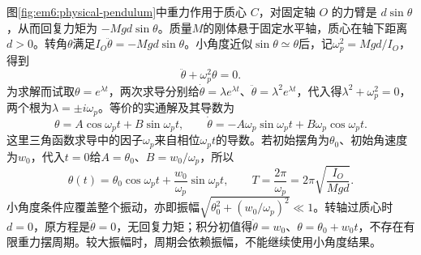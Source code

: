 
图\ref{fig:em6:physical-pendulum}中重力作用于质心 $C$，对固定轴 $O$ 的力臂是 $d\sin\theta$，从而回复力矩为 $-Mgd\sin\theta$。质量$M$的刚体悬于固定水平轴，质心在轴下距离$d>0$。转角$\theta$满足$I_O\ddot\theta=-Mgd\sin\theta$。小角度近似$\sin\theta\simeq\theta$后，记$\omega_p^2=Mgd/I_O$，得到
\[
 \ddot\theta+\omega_p^2\theta=0.
\]
为求解而试取$\theta=e^{\lambda t}$，两次求导分别给$\dot\theta=\lambda e^{\lambda t}$、$\ddot\theta=\lambda^2e^{\lambda t}$，代入得$\lambda^2+\omega_p^2=0$，两个根为$\lambda=\pm i\omega_p$。等价的实通解及其导数为
\[
 \theta=A\cos\omega_pt+B\sin\omega_pt,
 \qquad
 \dot\theta=-A\omega_p\sin\omega_pt+B\omega_p\cos\omega_pt.
\]
这里三角函数求导中的因子$\omega_p$来自相位$\omega_pt$的导数。若初始摆角为$\theta_0$、初始角速度为$w_0$，代入$t=0$给$A=\theta_0$、$B=w_0/\omega_p$，所以
\[
 \theta(t)=\theta_0\cos\omega_pt+\frac{w_0}{\omega_p}\sin\omega_pt,
 \qquad T=\frac{2\pi}{\omega_p}=2\pi\sqrt{\frac{I_O}{Mgd}}.
\]
小角度条件应覆盖整个振动，亦即振幅$\sqrt{\theta_0^2+(w_0/\omega_p)^2}\ll1$。转轴过质心时$d=0$，原方程是$\ddot\theta=0$，无回复力矩；积分初值得$\dot\theta=w_0$、$\theta=\theta_0+w_0t$，不存在有限重力摆周期。较大振幅时，周期会依赖振幅，不能继续使用小角度结果。

